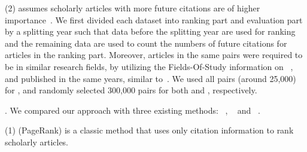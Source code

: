 \noindent
(2) \fcita assumes scholarly articles with more future citations are of higher importance~\cite{Wang13AAAI,Wang16TIST,Li08TSRanking}.
We first divided each dataset into ranking part and evaluation part by a splitting year such that data before the splitting year are used for ranking and the remaining data are used to count the numbers of future citations for articles in the ranking part.
%
Moreover, articles in the same pairs were required to be in similar research fields, by utilizing the Fields-Of-Study information on \magdata~\cite{Sinha15:MAG}, and published in the same years, similar to~\cite{Wang16TIST}.
We used all pairs (around 25,000) for \aan, and randomly selected 300,000 pairs for both \aminer and \magdata, respectively.





.
We compared our approach \ensemblerank with three existing methods: \pagerank~\cite{Brin98:PageRank}, \futurerank~\cite{sayyadi09} and \hhgrank~\cite{Liang16AAAI}.

\noindent
(1) \pagerank (PageRank) is a classic method that uses only citation information to rank scholarly articles.


